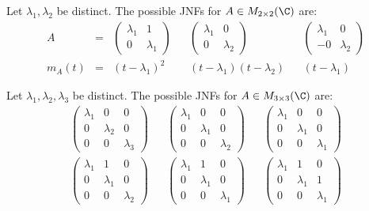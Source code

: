 \documentclass[../Main.tex]{subfiles}
\begin{document}
\begin{example}
    Let $\lambda_1, \lambda_2$ be distinct. The possible JNFs for $A \in M_{2 \times 2}(\C)$ are:
    \begin{align*}
    A &= &\begin{pmatrix}\lambda_1 & 1 \\ 0 & \lambda_1\end{pmatrix} && \begin{pmatrix}\lambda_1 & 0 \\ 0 & \lambda_2\end{pmatrix} && \begin{pmatrix}\lambda_1 & 0 \\ -0 & \lambda_2\end{pmatrix} \\
    m_A(t) &= & (t - \lambda_1)^2 && (t - \lambda_1)(t - \lambda_2) && (t - \lambda_1)
    \end{align*}
\end{example}
\begin{example}
    Let $\lambda_1, \lambda_2, \lambda_3$ be distinct. The possible JNFs for $A \in M_{3 \times 3}(\C)$ are:
    \begin{align*}
    \begin{pmatrix}
        \lambda_1 & 0 & 0 \\
        0 & \lambda_2 & 0 \\
        0 & 0 & \lambda_3
    \end{pmatrix}
    &&
    \begin{pmatrix}
        \lambda_1 & 0 & 0 \\
        0 & \lambda_1 & 0 \\
        0 & 0 & \lambda_2
    \end{pmatrix}
    &&
    \begin{pmatrix}
        \lambda_1 & 0 & 0 \\
        0 & \lambda_1 & 0 \\
        0 & 0 & \lambda_1
    \end{pmatrix}
    \\
    \begin{pmatrix}
        \lambda_1 & 1 & 0 \\
        0 & \lambda_1 & 0 \\
        0 & 0 & \lambda_2
    \end{pmatrix}
    &&
    \begin{pmatrix}
        \lambda_1 & 1 & 0 \\
        0 & \lambda_1 & 0 \\
        0 & 0 & \lambda_1
    \end{pmatrix}
    &&
    \begin{pmatrix}
        \lambda_1 & 1 & 0 \\
        0 & \lambda_1 & 1 \\
        0 & 0 & \lambda_1
    \end{pmatrix}
    \end{align*}
    \label{expJNF3}
\end{example}
\end{document}
